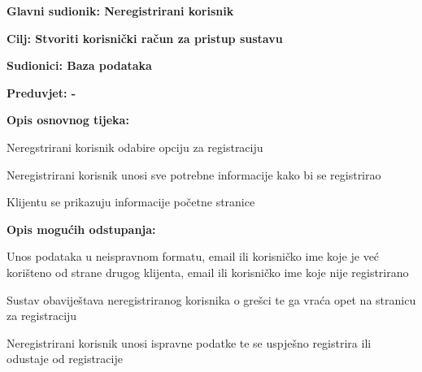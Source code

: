 					\noindent {}
					\begin{packed_item}
						
						\item \textbf{Glavni sudionik: Neregistrirani korisnik}
						\item  \textbf{Cilj: Stvoriti korisnički račun za pristup sustavu} 
						\item  \textbf{Sudionici: Baza podataka}
						\item  \textbf{Preduvjet: -}
						\item  \textbf{Opis osnovnog tijeka: }
						
						\item[] \begin{packed_enum}
							
							\item Neregstrirani korisnik odabire opciju za registraciju
							\item Neregistrirani korisnik unosi sve potrebne informacije kako bi se registrirao
							\item Klijentu se prikazuju informacije početne stranice
							
						\end{packed_enum}
						
						\item  \textbf{Opis mogućih odstupanja:}
						
						\item[] \begin{packed_item}
							
							\item[2.a] Unos podataka u neispravnom formatu, email ili korisničko ime koje je već korišteno od strane drugog klijenta, email ili korisničko ime koje nije registrirano
							\item[] \begin{packed_enum}
								
								\item Sustav obaviještava neregistriranog korisnika o grešci te ga vraća opet na stranicu za registraciju
								\item Neregistrirani korisnik unosi ispravne podatke te se uspješno registrira ili odustaje od registracije
								
							\end{packed_enum}
							
							
							
						\end{packed_item}
						
					\end{packed_item}
				

